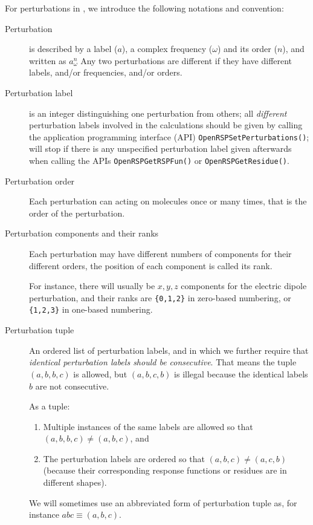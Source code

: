 For perturbations in \LibName, we introduce the following notations and
convention:
\begin{description}
  \item[Perturbation] is described by a label ($a$), a complex frequency
    ($\omega$) and its order ($n$), and written as $a_{\omega}^{n}$ Any
    two perturbations are different if they have different labels, and/or
    frequencies, and/or orders.
  \item[Perturbation label] is an integer distinguishing one perturbation
    from others; all \textit{different} perturbation labels involved in the
    calculations should be given by calling the application programming
    interface (API) \texttt{OpenRSPSetPerturbations()}; \LibName will stop if
    there is any unspecified perturbation label given afterwards when calling
    the APIs \texttt{OpenRSPGetRSPFun()} or \texttt{OpenRSPGetResidue()}.
  \item[Perturbation order] Each perturbation can acting on molecules once
    or many times, that is the order of the perturbation.
  \item[Perturbation components and their ranks] Each perturbation may have
    different numbers of components for their different orders, the position
    of each component is called its rank.

    For instance, there will usually be $x,y,z$ components for the electric
    dipole perturbation, and their ranks are \texttt{\{0,1,2\}} in zero-based
    numbering, or \texttt{\{1,2,3\}} in one-based numbering.
  \item[Perturbation tuple] An ordered list of perturbation labels, and in
    which we further require that \textit{identical perturbation labels should
    be consecutive}. That means the tuple $(a,b,b,c)$ is allowed, but $(a,b,c,b)$
    is illegal because the identical labels $b$ are not consecutive.

    As a tuple:
    \begin{enumerate}
      \item Multiple instances of the same labels are allowed so that
        $(a,b,b,c)\ne(a,b,c)$, and
      \item The perturbation labels are ordered so that $(a,b,c)\ne(a,c,b)$
        (because their corresponding response functions or residues are in
        different shapes).
    \end{enumerate}
    We will sometimes use an abbreviated form of perturbation tuple as,
    for instance $abc\equiv(a,b,c)$.


\end{description}
